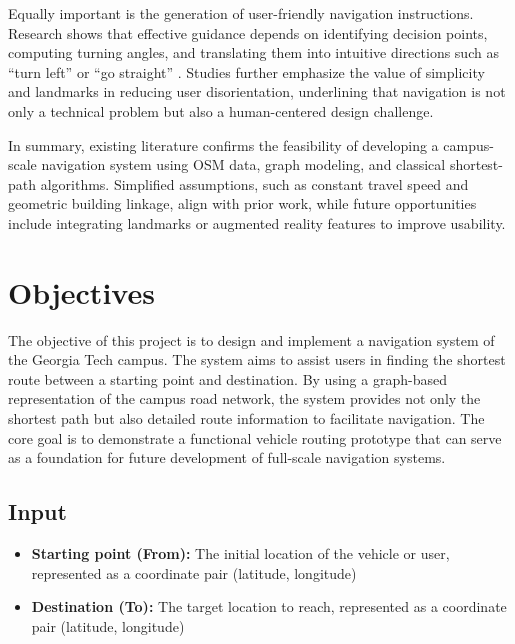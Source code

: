 \documentclass[fleqn,10pt]{olplainarticle}
\begin{document}
Equally important is the generation of user-friendly navigation instructions. Research shows that effective guidance depends on identifying decision points, computing turning angles, and translating them into intuitive directions such as “turn left” or “go straight” \cite{RICHTER2008233}. Studies further emphasize the value of simplicity and landmarks in reducing user disorientation, underlining that navigation is not only a technical problem but also a human-centered design challenge.

In summary, existing literature confirms the feasibility of developing a campus-scale navigation system using OSM data, graph modeling, and classical shortest-path algorithms. Simplified assumptions, such as constant travel speed and geometric building linkage, align with prior work, while future opportunities include integrating landmarks or augmented reality features to improve usability.

\section*{Objectives}
The objective of this project is to design and implement a navigation system of the Georgia Tech campus. The system aims to assist users in finding the shortest route between a starting point and destination. By using a graph-based representation of the campus road network, the system provides not only the shortest path but also detailed route information to facilitate navigation. The core goal is to demonstrate a functional vehicle routing prototype that can serve as a foundation for future development of full-scale navigation systems.

\subsection*{Input}
\begin{itemize}
    \item \textbf{Starting point (From):} The initial location of the vehicle or user, represented as a coordinate pair (latitude, longitude)
    \item \textbf{Destination (To):} The target location to reach, represented as a coordinate pair (latitude, longitude)
\end{itemize}
\end{document}

